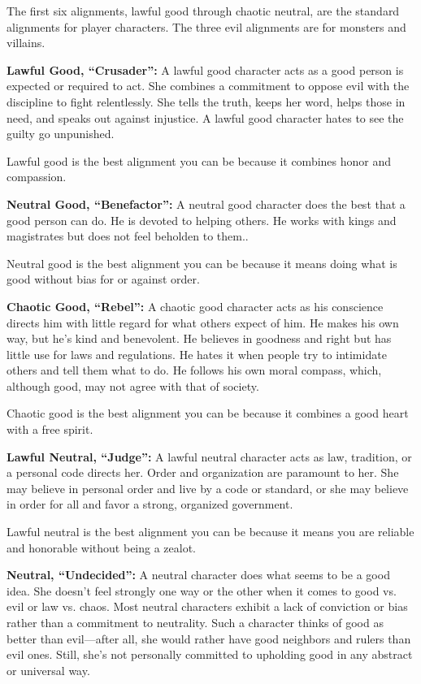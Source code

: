 \documentclass{article}
\begin{document}
The first six alignments, lawful good through chaotic neutral, are the standard 
alignments for player characters. The three evil alignments are for monsters and 
villains.

\vspace{12pt}
\textbf{Lawful Good, ``Crusader'': }A lawful good character acts as a good person 
is expected or required to act. She combines a commitment to oppose evil with the 
discipline to fight relentlessly. She tells the truth, keeps her word, helps those 
in need, and speaks out against injustice. A lawful good character hates to see 
the guilty go unpunished.

Lawful good is the best alignment you can be because it combines honor and compassion.

\vspace{12pt}
\textbf{Neutral Good, ``Benefactor'':} A neutral good character does the best that 
a good person can do. He is devoted to helping others. He works with kings and 
magistrates but does not feel beholden to them..

Neutral good is the best alignment you can be because it means doing what is good 
without bias for or against order.

\vspace{12pt}
\textbf{Chaotic Good, ``Rebel'':} A chaotic good character acts as his conscience 
directs him with little regard for what others expect of him. He makes his own 
way, but he's kind and benevolent. He believes in goodness and right but has little 
use for laws and regulations. He hates it when people try to intimidate others 
and tell them what to do. He follows his own moral compass, which, although good, 
may not agree with that of society.

Chaotic good is the best alignment you can be because it combines a good heart 
with a free spirit.

\vspace{12pt}
\textbf{Lawful Neutral, ``Judge'': }A lawful neutral character acts as law, tradition, 
or a personal code directs her. Order and organization are paramount to her. She 
may believe in personal order and live by a code or standard, or she may believe 
in order for all and favor a strong, organized government.

Lawful neutral is the best alignment you can be because it means you are reliable 
and honorable without being a zealot.

\vspace{12pt}
\textbf{Neutral, ``Undecided'':} A neutral character does what seems to be a good 
idea. She doesn't feel strongly one way or the other when it comes to good vs. 
evil or law vs. chaos. Most neutral characters exhibit a lack of conviction or 
bias rather than a commitment to neutrality. Such a character thinks of good as 
better than evil---after all, she would rather have good neighbors and rulers than 
evil ones. Still, she's not personally committed to upholding good in any abstract 
or universal way.
\end{document}
